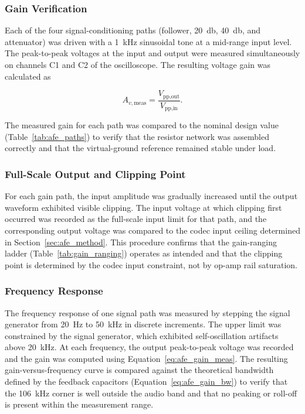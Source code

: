 \subsubsection{Gain Verification}

Each of the four signal-conditioning paths (follower, \SI{20}{\decibel}, \SI{40}{\decibel}, and attenuator) was driven with a \SI{1}{\kilo\hertz} sinusoidal tone at a mid-range input level. The peak-to-peak voltages at the input and output were measured simultaneously on channels C1 and C2 of the oscilloscope. The resulting voltage gain was calculated as

\begin{equation}
  A_{v,\text{meas}} = \frac{V_{\text{pp,out}}}{V_{\text{pp,in}}}.
  \label{eq:afe_gain_meas}
\end{equation}

The measured gain for each path was compared to the nominal design value (Table~\ref{tab:afe_paths}) to verify that the resistor network was assembled correctly and that the virtual-ground reference remained stable under load. 

\subsubsection{Full-Scale Output and Clipping Point}

For each gain path, the input amplitude was gradually increased until the output waveform exhibited visible clipping. The input voltage at which clipping first occurred was recorded as the full-scale input limit for that path, and the corresponding output voltage was compared to the codec input ceiling determined in Section~\ref{sec:afe_method}. This procedure confirms that the gain-ranging ladder (Table~\ref{tab:gain_ranging}) operates as intended and that the clipping point is determined by the codec input constraint, not by op-amp rail saturation.

\subsubsection{Frequency Response}

The frequency response of one signal path was measured by stepping the signal generator from \SI{20}{\hertz} to \SI{50}{\kilo\hertz} in discrete increments. The upper limit was constrained by the signal generator, which exhibited self-oscillation artifacts above \SI{20}{\kilo\hertz}. At each frequency, the output peak-to-peak voltage was recorded and the gain was computed using Equation~\ref{eq:afe_gain_meas}. The resulting gain-versus-frequency curve is compared against the theoretical bandwidth defined by the feedback capacitors (Equation~\ref{eq:afe_gain_bw}) to verify that the \SI{106}{\kilo\hertz} corner is well outside the audio band and that no peaking or roll-off is present within the measurement range.

